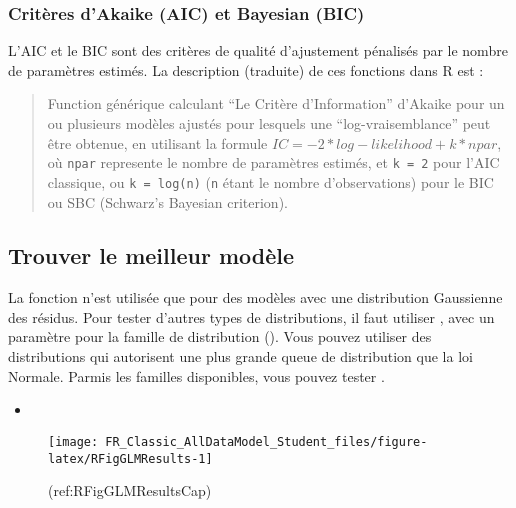 \documentclass[french,a4paper]{article}
\begin{document}
\hypertarget{criteres-dakaike-aic-et-bayesian-bic}{%
\subsubsection{Critères d'Akaike (AIC) et Bayesian (BIC)}\label{criteres-dakaike-aic-et-bayesian-bic}}

L'AIC et le BIC sont des critères de qualité d'ajustement pénalisés par le nombre de paramètres estimés. La description (traduite) de ces fonctions dans R est :

\begin{quote}
Function générique calculant ``Le Critère d'Information'' d'Akaike pour un ou plusieurs modèles ajustés pour lesquels une ``log-vraisemblance'' peut être obtenue, en utilisant la formule \(IC = -2*log-likelihood + k*npar\), où \texttt{npar} represente le nombre de paramètres estimés, et \texttt{k\ =\ 2} pour l'AIC classique, ou \texttt{k\ =\ log(n)} (\texttt{n} étant le nombre d'observations) pour le BIC ou SBC (Schwarz's Bayesian criterion).
\end{quote}

\hypertarget{trouver-le-meilleur-modele}{%
\subsection{Trouver le meilleur modèle}\label{trouver-le-meilleur-modele}}

La fonction  n'est utilisée que pour des modèles avec une distribution Gaussienne des résidus. Pour tester d'autres types de distributions, il faut utiliser , avec un paramètre pour la famille de distribution (). Vous pouvez utiliser des distributions qui autorisent une plus grande queue de distribution que la loi Normale. Parmis les familles disponibles, vous pouvez tester .

\begin{itemize}
\item
\end{itemize}

\begin{figure}[!h]

{\centering \texttt{[image: FR\_Classic\_AllDataModel\_Student\_files/figure-latex/RFigGLMResults-1]} 

}

\caption{(ref:RFigGLMResultsCap)}\label{fig:RFigGLMResults}
\end{figure}
\end{document}
